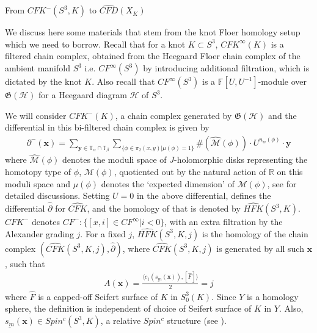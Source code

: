 \documentclass[11pt,reqno]{amsart}
\theoremstyle{definition}
\newtheorem *{remark}{Remark}
\newcommand{\hfkhat}{\widehat{\mathit{HFK}}}
\newcommand{\cfkhat}{\widehat{\mathit{CFK}}}
\begin{document}
 \begin{subsection}{From $CFK^{-}(S^3,K)$ to $\widehat{CFD}(X_K)$}
 
 We discuss here some materials that stem from the knot Floer homology setup which we need to borrow. Recall that for a knot $K\subset S^3$, $CFK^{\infty}(K)$ is a filtered chain complex, obtained from the Heegaard Floer chain complex of the ambient manifold $S^3$ i.e. $CF^{\infty}(S^3)$ by introducing additional filtration, which is dictated by the knot $K$. Also recall that $CF^{\infty}(S^3)$ is a $\mathbb{F}[U,U^{-1}]$-module over $\mathfrak{G}(\mathcal{H})$ for a Heegaard diagram $\mathcal{H}$ of $S^3$. 


We will consider $CFK^{-}(K)$, a chain complex generated by $\mathfrak{G}(\mathcal{H})$ and the differential in this bi-filtered chain complex is given by  
\begin{align*}
    \partial^{-}(\bm{x}) = \sum_{\bm{y} \in \mathbb{T}_\alpha \cap \mathbb{T}_\beta } \sum_{\{\phi \in \pi_2(x,y)|\mu({\phi}) = 1\}} \#(\widehat{\mathcal{M}}({\phi}))\cdot U^{n_w(\phi)} \cdot \bm{y}
\end{align*}
where $\widehat{\mathcal{M}}(\phi)$ denotes the moduli space of $J$-holomorphic disks representing the homotopy type of $\phi$, $\mathcal{M}(\phi)$, quotiented out by the natural action of $\mathbb{R}$ on this moduli space and $\mu(\phi)$ denotes the `expected dimension' of $\mathcal{M}(\phi)$, see \cite{osknot04} for detailed discussions. Setting $U=0$ in the above differential, defines the differential $\hat{\partial}$ for $\cfkhat$, and the homology of that is denoted by $\widehat{HFK}(S^3,K)$.
$CFK^{-}$ denotes $CF^{-}: \{[x,i] \in CF^{\infty}| i<0\}$, with an extra filtration by the Alexander grading $j$.
For a fixed $j$, $\hfkhat(S^3,K,j)$ is the homology of the chain complex  $(\cfkhat(S^3,K,j), \hat{\partial})$, where $\cfkhat(S^3,K,j)$ is generated by all such $\bm{x}$, such that
\begin{align*}
    A(\bm{x}) = \frac{\langle c_1(\underline{s_m}(\bm{x})), [\widehat{F}] \rangle}{2} = j
\end{align*}
where $\widehat{F}$ is a capped-off Seifert surface of $K$ in $S^3_0(K)$. Since $Y$ is a homology sphere, the definition is independent of choice of Seifert surface of $K$ in $Y$. Also, $\underline {s_m}(\bm{x}) \in Spin^c(S^3,K)$, a relative $Spin^c$ structure (see \cite[Section 2.3]{osknot04}).\\


\end{subsection}
\end{document}
